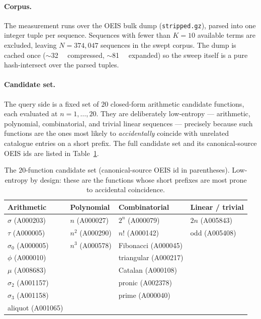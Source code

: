 \documentclass[11pt,a4paper]{article}
\newcommand{\sig}{\sigma}
\theoremstyle{definition}
\begin{document}
\paragraph{Corpus.} The measurement runs over the OEIS bulk dump
(\texttt{stripped.gz}), parsed into one integer tuple per sequence. Sequences
with fewer than $K=10$ available terms are excluded, leaving
$N = 374{,}047$ sequences in the swept corpus. The dump is cached once
(\(\sim\)\SI{32}{\mega\byte} compressed, \(\sim\)\SI{81}{\mega\byte} expanded)
so the sweep itself is a pure hash-intersect over the parsed tuples.

\paragraph{Candidate set.} The query side is a fixed set of $20$ closed-form
arithmetic candidate functions, each evaluated at $n=1,\dots,20$. They are
deliberately low-entropy --- arithmetic, polynomial, combinatorial, and trivial
linear sequences --- precisely because such functions are the ones most likely
to \emph{accidentally} coincide with unrelated catalogue entries on a short
prefix. The full candidate set and its canonical-source OEIS ids are listed in
Table~\ref{tab:candidates}.

\begin{table}[t]
\centering
\caption{The $20$-function candidate set (canonical-source OEIS id in
parentheses). Low-entropy by design: these are the functions whose short
prefixes are most prone to accidental coincidence.}
\label{tab:candidates}
\small
\begin{tabular}{@{}llll@{}}
\toprule
\textbf{Arithmetic} & \textbf{Polynomial} & \textbf{Combinatorial} & \textbf{Linear / trivial}\\
\midrule
$\sig$ (A000203)      & $n$ (A000027)         & $2^n$ (A000079)       & $2n$ (A005843)\\
$\tau$ (A000005)      & $n^2$ (A000290)       & $n!$ (A000142)        & odd (A005408)\\
$\sig_0$ (A000005)    & $n^3$ (A000578)       & Fibonacci (A000045)   & \\
$\phi$ (A000010)      &                       & triangular (A000217)  & \\
$\mu$ (A008683)       &                       & Catalan (A000108)     & \\
$\sig_2$ (A001157)    &                       & pronic (A002378)      & \\
$\sig_3$ (A001158)    &                       & prime (A000040)       & \\
aliquot (A001065)     &                       &                       & \\
\bottomrule
\end{tabular}
\end{table}
\end{document}
